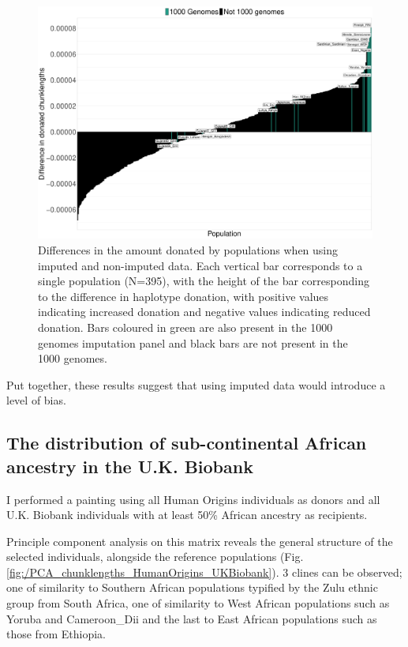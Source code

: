 \begin{figure}
	    \centering
	    \includegraphics[width=1.0\textwidth]{../images/chapter3/imputed_excess_copying_pops.pdf}
	    \caption{Differences in the amount donated by populations when using imputed and non-imputed data. Each vertical bar corresponds to a single population (N=395), with the height of the bar corresponding to the difference in haplotype donation, with positive values indicating increased donation and negative values indicating reduced donation. Bars coloured in green are also present in the 1000 genomes imputation panel and black bars are not present in the 1000 genomes.}
	    \label{fig:imputed_excess_copying_pops}
\end{figure}

Put together, these results suggest that using imputed data would introduce a level of bias. 




\subsection{The distribution of sub-continental African ancestry in the U.K. Biobank}

I performed a painting using all Human Origins individuals as donors and all U.K. Biobank individuals with at least 50\% African ancestry as recipients. 

Principle component analysis on this matrix reveals the general structure of the selected individuals, alongside the reference populations (Fig. \ref{fig:/PCA_chunklengths_HumanOrigins_UKBiobank}). 3 clines can be observed; one of similarity to Southern African populations typified by the Zulu ethnic group from South Africa, one of similarity to West African populations such as Yoruba and Cameroon\_Dii and the last to East African populations such as those from Ethiopia. 


